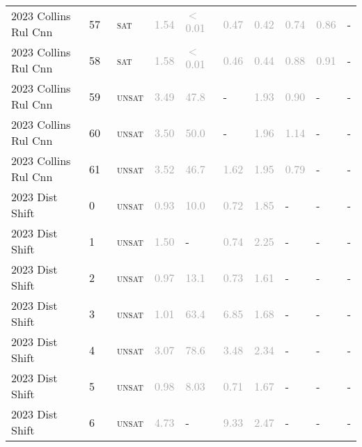 \begin{center}
{\begin{longtable}{@{}llllllllll@{}}
2023 Collins Rul Cnn & 57 & ~\textsc{sat} & \textcolor{darkgray}{1.54} & \textcolor{darkgray}{$<$0.01} & \textcolor{darkgray}{0.47} & \textcolor{darkgray}{0.42} & \textcolor{darkgray}{0.74} & \textcolor{darkgray}{0.86} & - \\
2023 Collins Rul Cnn & 58 & ~\textsc{sat} & \textcolor{darkgray}{1.58} & \textcolor{darkgray}{$<$0.01} & \textcolor{darkgray}{0.46} & \textcolor{darkgray}{0.44} & \textcolor{darkgray}{0.88} & \textcolor{darkgray}{0.91} & - \\
2023 Collins Rul Cnn & 59 & ~\textsc{unsat} & \textcolor{darkgray}{3.49} & \textcolor{darkgray}{47.8} & - & \textcolor{darkgray}{1.93} & \textcolor{darkgray}{0.90} & - & - \\
2023 Collins Rul Cnn & 60 & ~\textsc{unsat} & \textcolor{darkgray}{3.50} & \textcolor{darkgray}{50.0} & - & \textcolor{darkgray}{1.96} & \textcolor{darkgray}{1.14} & - & - \\
2023 Collins Rul Cnn & 61 & ~\textsc{unsat} & \textcolor{darkgray}{3.52} & \textcolor{darkgray}{46.7} & \textcolor{darkgray}{1.62} & \textcolor{darkgray}{1.95} & \textcolor{darkgray}{0.79} & - & - \\
\midrule
2023 Dist Shift & 0 & ~\textsc{unsat} & \textcolor{darkgray}{0.93} & \textcolor{darkgray}{10.0} & \textcolor{darkgray}{0.72} & \textcolor{darkgray}{1.85} & - & - & - \\
2023 Dist Shift & 1 & ~\textsc{unsat} & \textcolor{darkgray}{1.50} & - & \textcolor{darkgray}{0.74} & \textcolor{darkgray}{2.25} & - & - & - \\
2023 Dist Shift & 2 & ~\textsc{unsat} & \textcolor{darkgray}{0.97} & \textcolor{darkgray}{13.1} & \textcolor{darkgray}{0.73} & \textcolor{darkgray}{1.61} & - & - & - \\
2023 Dist Shift & 3 & ~\textsc{unsat} & \textcolor{darkgray}{1.01} & \textcolor{darkgray}{63.4} & \textcolor{darkgray}{6.85} & \textcolor{darkgray}{1.68} & - & - & - \\
2023 Dist Shift & 4 & ~\textsc{unsat} & \textcolor{darkgray}{3.07} & \textcolor{darkgray}{78.6} & \textcolor{darkgray}{3.48} & \textcolor{darkgray}{2.34} & - & - & - \\
2023 Dist Shift & 5 & ~\textsc{unsat} & \textcolor{darkgray}{0.98} & \textcolor{darkgray}{8.03} & \textcolor{darkgray}{0.71} & \textcolor{darkgray}{1.67} & - & - & - \\
2023 Dist Shift & 6 & ~\textsc{unsat} & \textcolor{darkgray}{4.73} & - & \textcolor{darkgray}{9.33} & \textcolor{darkgray}{2.47} & - & - & - \\

\end{longtable}}
\end{center}
